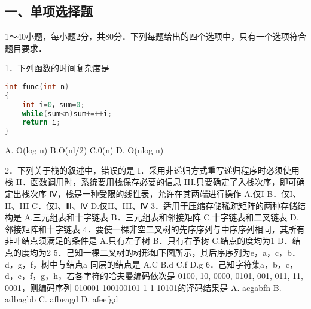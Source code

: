 

\subsection{一、单项选择题}
1～40小题，每小题2分，共80分．下列每题给出的四个选项中，只有一个选项符合题目要求．

1．下列函数的时间复杂度是 \\
\begin{lstlisting}[language=cpp]
int func(int n)
{
    int i=0，sum=0;
    while(sum<n)sum+=++i;
    return i;
}
\end{lstlisting}
    A. O(log n)  B.O(nl/2)    C.0(n)    D. O(nlog n)
    
2．下列关于栈的叙述中，错误的是
    I．采用非递归方式重写递归程序时必须使用栈
    II．函数调用时，系统要用栈保存必要的信息
    III.只要确定了入栈次序，即可确定出栈次序
    Ⅳ，栈是一种受限的线性表，允许在其两端进行操作
    A.仅I    B．仅I、II、III
    C．仅I、Ⅲ、Ⅳ    D.仅II、III、Ⅳ
    3．适用于压缩存储稀疏矩阵的两种存储结构是
    A.三元组表和十字链表  B．三元组表和邻接矩阵
    C.十字链表和二叉链表    D.邻接矩阵和十字链表
    4．要使一棵非空二叉树的先序序列与中序序列相同，其所有非叶结点须满足的条件是
    A.只有左子树    B．只有右予树
    C.结点的度均为1    D．结点的度均为2
    5．己知一棵二叉树的树形如下图所示，其后序序列为e，a，c，b．d，g，f，树中与结点a
同层的结点是
A.C    B.d    C.f    D.g
6．己知字符集{a，b，c，d，e，f，g，h}，若各字符的哈夫曼编码依次是
0100, 10, 0000, 0101, 001, 011, 11, 0001，则编码序列
010001 100100101 1 1 10101的译码结果是
A. acgabfh    B. adbagbb
C. afbeagd  D. afeefgd